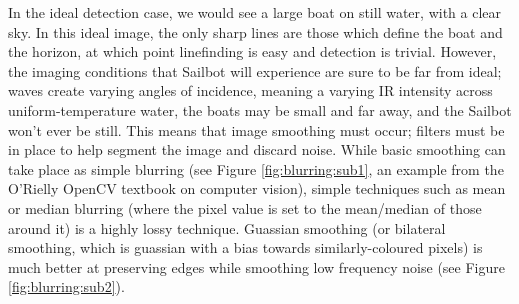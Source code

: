 In the ideal detection case, we would see a large boat on still water, with a clear sky. In this ideal image, the only sharp lines are those which define the boat and the horizon, at which point linefinding is easy and detection is trivial. However, the imaging conditions that Sailbot will experience are sure to be far from ideal; waves create varying angles of incidence, meaning a varying IR intensity across uniform-temperature water, the boats may be small and far away, and the Sailbot won't ever be still. This means that image smoothing must occur; filters must be in place to help segment the image and discard noise. While basic smoothing can take place as simple blurring (see Figure \ref{fig:blurring:sub1}, an example from the O'Rielly OpenCV textbook on computer vision), simple techniques such as mean or median blurring (where the pixel value is set to the mean/median of those around it) is a highly lossy technique. Guassian smoothing (or bilateral smoothing, which is guassian with a bias towards similarly-coloured pixels) is much better at preserving edges while smoothing low frequency noise (see Figure \ref{fig:blurring:sub2}).


